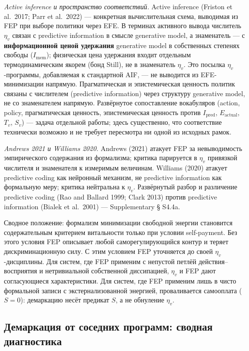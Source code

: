 \documentclass[pdflatex,sn-mathphys-ay]{sn-jnl}
\begin{document}
\emph{Active inference и пространство соответствий.} Active inference (Friston et al.~2017; Parr et al.~2022) --- конкретная вычислительная схема, выводимая из FEP при выборе политики через EFE. В терминах активного вывода числитель \(\eta_v\) связан с predictive information в смысле generative model, а знаменатель --- с \textbf{информационной ценой удержания} generative model в собственных степенях свободы (\(I_{\text{mem}}\)); физическая цена удержания входит отдельным термодинамическим якорем (бонд Still), не в знаменатель \(\eta_v\). Это посылка \(\eta_v\)-программы, добавляемая к стандартной AIF, --- не выводится из EFE-минимизации напрямую. Прагматическая и эпистемическая ценность политик связаны с числителем (predictive information) через структуру generative model, не со знаменателем напрямую. Развёрнутое сопоставление вокабуляров (action, policy, прагматическая ценность, эпистемическая ценность против \(I_{\text{pred}}\), \(E_{\text{actual}}\), \(T_v\), \(S_v\)) --- задача отдельной работы; здесь существенно, что соответствие технически возможно и не требует пересмотра ни одной из исходных рамок.

\emph{Andrews 2021 и Williams 2020.} Andrews (2021) атакует FEP за невыводимость эмпирического содержания из формализма; критика парируется в \(\eta_v\) привязкой числителя и знаменателя к измеримым величинам. Williams (2020) атакует predictive coding как нейронный механизм, не predictive information как формальную меру; критика нейтральна к \(\eta_v\). Развёрнутый разбор и различение predictive coding (Rao and Ballard 1999; Clark 2013) против predictive information (Bialek et al.~2001) --- Supplementary § S4.4a.

Сводное положение: формализм минимизации свободной энергии становится содержательным критерием витальности только при условии self-payment. Без этого условия FEP описывает любой саморегулирующийся контур и теряет дискриминационную силу. С этим условием FEP уточняется до своей \(\eta_v\)-дисциплины. Для систем, где FEP применим с непустой петлёй действия--восприятия и нетривиальной собственной диссипацией, \(\eta_v\) и FEP дают согласующиеся характеристики. Для систем, где FEP применим лишь в чисто формальной записи с экстернализованной энергией, проваливается самооплата (\(S = 0\)): демаркацию несёт предикат \(S\), а не обнуление \(\eta_v\).

\subsection{Демаркация от соседних программ: сводная диагностика}\label{ux434ux435ux43cux430ux440ux43aux430ux446ux438ux44f-ux43eux442-ux441ux43eux441ux435ux434ux43dux438ux445-ux43fux440ux43eux433ux440ux430ux43cux43c-ux441ux432ux43eux434ux43dux430ux44f-ux434ux438ux430ux433ux43dux43eux441ux442ux438ux43aux430}
\end{document}
